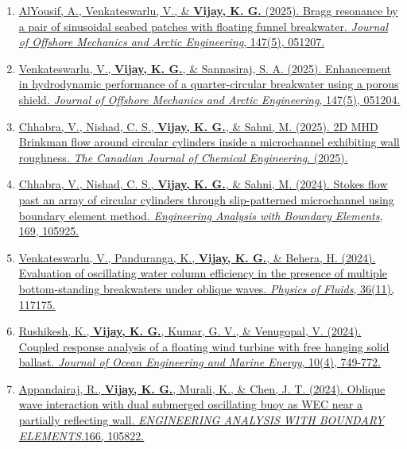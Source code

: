 \begin{enumerate}[label=\protect\circled{\arabic*}]
\item \href{https://doi.org/10.1115/1.4069178}{%
AlYousif, A., Venkateswarlu, V., \& \textbf{Vijay, K. G.} (2025). Bragg resonance by a pair of sinusoidal seabed patches with floating funnel breakwater. \textit{Journal of Offshore Mechanics and Arctic Engineering}, 147(5), 051207.}

\item \href{https://doi.org/10.1115/1.4068058}{%
Venkateswarlu, V., \textbf{Vijay, K. G.}, \& Sannasiraj, S. A. (2025). Enhancement in hydrodynamic performance of a quarter-circular breakwater using a porous shield. \textit{Journal of Offshore Mechanics and Arctic Engineering}, 147(5), 051204.}

\item \href{https://doi.org/10.1002/cjce.70057}{%
Chhabra, V., Nishad, C. S., \textbf{Vijay, K. G.}, \& Sahni, M. (2025). 2D MHD Brinkman flow around circular cylinders inside a microchannel exhibiting wall roughness. \textit{The Canadian Journal of Chemical Engineering}. (2025).}

\item \href{https://doi.org/10.1016/j.enganabound.2024.105925}{%
Chhabra, V., Nishad, C. S., \textbf{Vijay, K. G.}, \& Sahni, M. (2024). Stokes flow past an array of circular cylinders through slip-patterned microchannel using boundary element method. \textit{Engineering Analysis with Boundary Elements}, 169, 105925.}

\item \href{https://doi.org/10.1063/5.0237370}{%
Venkateswarlu, V., Panduranga, K., \textbf{Vijay, K. G.}, \& Behera, H. (2024). Evaluation of oscillating water column efficiency in the presence of multiple bottom-standing breakwaters under oblique waves. \textit{Physics of Fluids}, 36(11), 117175.}

\item \href{https://link.springer.com/article/10.1007/s40722-024-00343-z}{%
Rushikesh, K., \textbf{Vijay, K. G.}, Kumar, G. V., \& Venugopal, V. (2024). Coupled response analysis of a floating wind turbine with free hanging solid ballast. \textit{Journal of Ocean Engineering and Marine Energy}, 10(4), 749-772.}

\item \href{https://doi.org/10.1016/j.enganabound.2024.105822}{%
Appandairaj, R., \textbf{Vijay, K. G.}, Murali, K., \& Chen, J. T. (2024). Oblique wave interaction with dual submerged oscillating buoy as WEC near a partially reflecting wall. \textit{ENGINEERING ANALYSIS WITH BOUNDARY ELEMENTS}.166, 105822.}
 

\end{enumerate}
